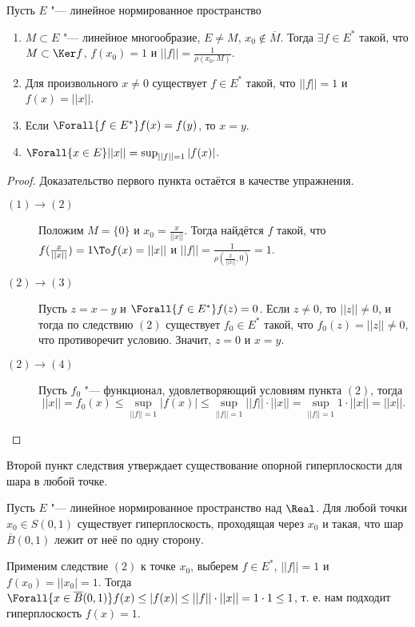 \documentclass[main]{subfiles}
\begin{document}
\begin{corollary}
  Пусть $E$ "--- линейное нормированное пространство
  \begin{enumerate}
    \item $M \subset E$ "--- линейное многообразие, $E \ne M$,
      $x_0 \notin \overline{M}$. Тогда $\exists f \in E^*$ такой,
      что $M \subset \Ker f $, $f(x_0) = 1$ и $||f|| = \frac{1}{\rho(x_0, M)}$.
    \item Для произвольного $x \ne 0$ существует $f \in E^*$ такой, что
      \( ||f|| = 1 \) и $f(x) = ||x||$.
    \item Если $\Forall{f \in E^*} f(x) = f(y)$, то $x = y$.
    \item $\Forall{x \in E} ||x|| = \sup_{||f|| = 1} |f(x)|$.
  \end{enumerate}
\end{corollary}
\begin{proof}
  Доказательство первого пункта остаётся в качестве упражнения.

  \begin{description}
    \item[$(1) \to (2)$]
      Положим $M = \{ 0 \}$ и $x_0 = \frac{x}{||x||}$. Тогда
      найдётся $f$ такой, что $f(\frac{x}{||x||}) = 1 \To
      f(x) = ||x||$ и $||f|| = \frac{1}{\rho(\frac{x}{||x||}, {0})} = 1$.
    \item[$(2) \to (3)$]
      Пусть $z = x - y$ и $\Forall{f \in E^*} f(z) = 0$.
      Если $z \ne 0$, то $||z|| \ne 0$, и тогда по следствию $(2)$
      существует $f_0 \in E^*$ такой, что $f_0(z) = ||z|| \ne 0$,
      что противоречит условию. Значит, $z = 0$ и $x = y$.
    \item[$(2) \to (4)$]
      Пусть $f_0$ "--- функционал, удовлетворяющий условиям пункта $(2)$,
      тогда
      \[ ||x|| = f_0(x) \le \sup_{||f|| = 1} |f(x)| \le
	\sup_{||f|| = 1} ||f|| \cdot ||x|| =
      \sup_{||f|| = 1} 1 \cdot ||x|| = ||x||. \]
  \end{description}
\end{proof}

\begin{remark}
  Второй пункт следствия утверждает существование опорной гиперплоскости для шара в любой точке.

  Пусть $E$ "--- линейное нормированное пространство над $\Real$.
  Для любой точки $x_0 \in S(0, 1)$ существует гиперплоскость,
  проходящая через $x_0$ и такая, что шар $\overline{B}(0, 1)$
  лежит от неё по одну сторону.

  Применим следствие $(2)$ к точке $x_0$, выберем $f \in E^*$,
  $||f|| = 1$ и $f(x_0) = ||x_0| = 1$. Тогда
  $\Forall{x \in \overline{B}(0, 1)} f(x) \le |f(x)| \le
  ||f|| \cdot ||x|| = 1 \cdot 1 \le 1$, т. е. нам подходит
  гиперплоскость $f(x) = 1$.
\end{remark}
\end{document}
